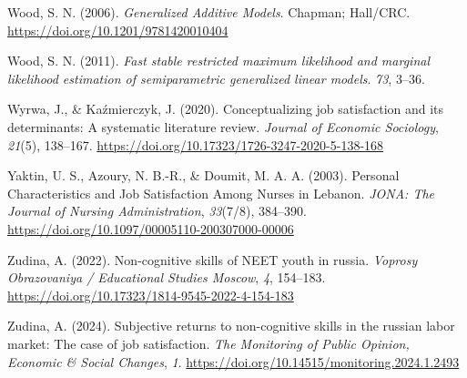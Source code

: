 \documentclass[
]{interact}
\newlength{\cslhangindent}
\newenvironment{CSLReferences}[2] %
 {\begin{list}{}{%
  \setlength{\itemindent}{0pt}
  \setlength{\leftmargin}{0pt}
  \setlength{\parsep}{0pt}
  \ifodd #1
   \setlength{\leftmargin}{\cslhangindent}
   \setlength{\itemindent}{-1\cslhangindent}
  \fi
  \setlength{\itemsep}{#2\baselineskip}}}
 {\end{list}}
\begin{document}
\begin{CSLReferences}{1}{0}
Wood, S. N. (2006). \emph{Generalized Additive Models}. Chapman;
Hall/CRC. \url{https://doi.org/10.1201/9781420010404}

Wood, S. N. (2011). \emph{Fast stable restricted maximum likelihood and
marginal likelihood estimation of semiparametric generalized linear
models}. \emph{73}, 3--36.

Wyrwa, J., \& Kaźmierczyk, J. (2020). Conceptualizing job satisfaction
and its determinants: A systematic literature review. \emph{Journal of
Economic Sociology}, \emph{21}(5), 138--167.
\url{https://doi.org/10.17323/1726-3247-2020-5-138-168}

Yaktin, U. S., Azoury, N. B.-R., \& Doumit, M. A. A. (2003). Personal
Characteristics and Job Satisfaction Among Nurses in Lebanon.
\emph{JONA: The Journal of Nursing Administration}, \emph{33}(7/8),
384--390. \url{https://doi.org/10.1097/00005110-200307000-00006}

Zudina, A. (2022). Non-cognitive skills of NEET youth in russia.
\emph{Voprosy Obrazovaniya / Educational Studies Moscow}, \emph{4},
154--183. \url{https://doi.org/10.17323/1814-9545-2022-4-154-183}

Zudina, A. (2024). Subjective returns to non-cognitive skills in the
russian labor market: The case of job satisfaction. \emph{The Monitoring
of Public Opinion, Economic \& Social Changes}, \emph{1}.
\url{https://doi.org/10.14515/monitoring.2024.1.2493}

\end{CSLReferences}
\end{document}
